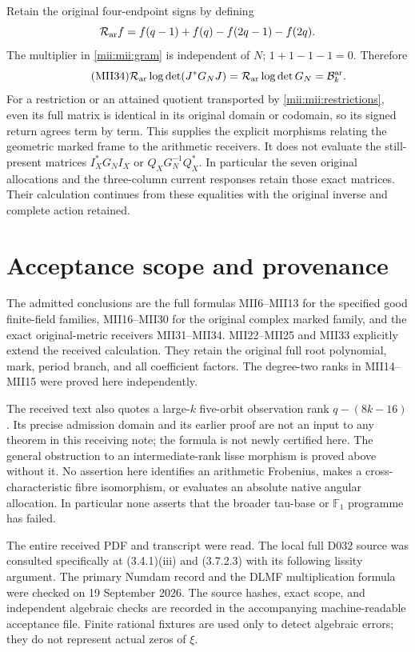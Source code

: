 Retain the original four-endpoint signs by defining
\[
 \mathcal R_{\rm ar}f=f(q-1)+f(q)-f(2q-1)-f(2q).
\]
The multiplier in \eqref{mii:mii:gram} is independent of $N$;
$1+1-1-1=0$. Therefore
\begin{equation}\tag{MII34}\label{mii:mii:return}
 \mathcal R_{\rm ar}\log\det(J^*G_NJ)
    =\mathcal R_{\rm ar}\log\det G_N
    =\mathcal B_k^{\rm ar}.
\end{equation}
For a restriction or an attained quotient transported by
\eqref{mii:mii:restrictions}, even its full matrix is identical in its
original domain or codomain, so its signed return agrees term by
term. This supplies the explicit morphisms relating the geometric
marked frame to the arithmetic receivers. It does not evaluate
the still-present matrices $I_X^*G_NI_X$ or $Q_XG_N^{-1}Q_X^*$.
In particular the seven original allocations and the three-column
current responses retain those exact matrices. Their calculation
continues from these equalities with the original inverse and
complete action retained.

\section{Acceptance scope and provenance}
The admitted conclusions are the full formulas MII6--MII13 for
the specified good finite-field families, MII16--MII30 for the
original complex marked family, and the exact original-metric
receivers MII31--MII34. MII22--MII25 and MII33 explicitly extend
the received calculation. They retain the original full root
polynomial, mark, period branch, and all coefficient factors.
The degree-two ranks in MII14--MII15 were proved here independently.

The received text also quotes a large-$k$ five-orbit observation
rank $q-(8k-16)$. Its precise admission domain and its earlier
proof are not an input to any theorem in this receiving note;
the formula is not newly certified here. The general obstruction
to an intermediate-rank lisse morphism is proved above without it.
No assertion here identifies an arithmetic Frobenius, makes a
cross-characteristic fibre isomorphism, or evaluates an absolute
native angular allocation. In particular none asserts that the
broader tau-base or $\mathbb F_1$ programme has failed.

The entire received PDF and transcript were read. The local full
D032 source was consulted specifically at (3.4.1)(iii) and
(3.7.2.3) with its following lissity argument. The primary Numdam
record and the DLMF multiplication formula were checked on
19 September 2026. The source hashes, exact scope, and independent
algebraic checks are recorded in the accompanying machine-readable
acceptance file. Finite rational fixtures are used only to detect
algebraic errors; they do not represent actual zeros of $\xi$.



